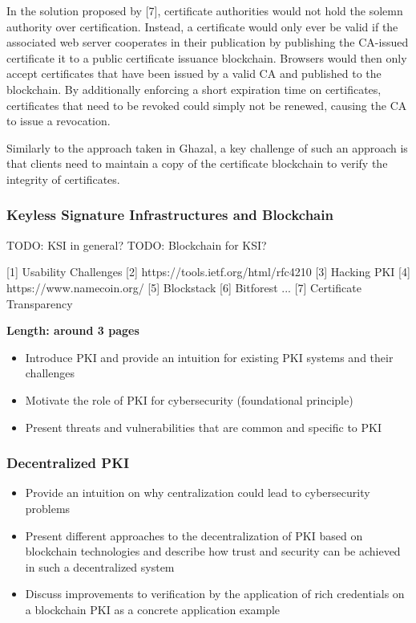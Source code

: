 In the solution proposed by [7], certificate authorities would not hold the solemn authority over certification. Instead, a certificate would only ever be valid if the associated web server cooperates in their publication by publishing the CA-issued certificate it to a public certificate issuance blockchain. Browsers would then only accept certificates that have been issued by a valid CA and published to the blockchain. By additionally enforcing a short expiration time on certificates, certificates that need to be revoked could simply not be renewed, causing the CA to issue a revocation.

Similarly to the approach taken in Ghazal, a key challenge of such an approach is that clients need to maintain a copy of the certificate blockchain to verify the integrity of certificates.


\subsubsection{Keyless Signature Infrastructures and Blockchain}
TODO: KSI in general?
TODO: Blockchain for KSI?


[1] Usability Challenges
  [2] https://tools.ietf.org/html/rfc4210
[3] Hacking PKI
  [4] https://www.namecoin.org/
[5] Blockstack
  [6] Bitforest
...
  [7] Certificate Transparency

\textbf{Length: around 3 pages}

\begin{itemize}
  \item Introduce PKI and provide an intuition for existing PKI systems and their challenges \cite{Straub2006}
  \item Motivate the role of PKI for cybersecurity (foundational principle)
  \item Present threats and vulnerabilities that are common and specific to PKI
\end{itemize}

\subsubsection{Decentralized PKI}

\begin{itemize}
  \item Provide an intuition on why centralization could lead to cybersecurity problems
  \item Present different approaches to the decentralization of PKI based on blockchain technologies and describe how trust and security can be achieved in such a decentralized system \cite{Ali2016} \cite{Dong2018} \cite{Dong2018a}
  \item Discuss improvements to verification by the application of rich credentials on a blockchain PKI as a concrete application example
\end{itemize}

